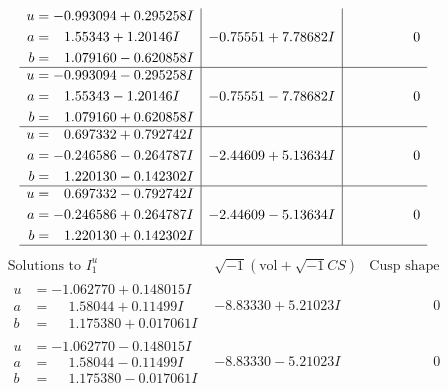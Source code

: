 \documentclass[1p]{elsarticle_modified}
\theoremstyle{definition}
\newcommand{\I}{\sqrt{-1}}
\begin{document}
$$\begin{array}{c|c|c}
\begin{aligned}
u &= -0.993094 + 0.295258 I \\
a &= \phantom{-}1.55343 + 1.20146 I \\
b &= \phantom{-}1.079160 - 0.620858 I\end{aligned}
 & -0.75551 + 7.78682 I & \phantom{-0.000000 } 0 \\ \hline\begin{aligned}
u &= -0.993094 - 0.295258 I \\
a &= \phantom{-}1.55343 - 1.20146 I \\
b &= \phantom{-}1.079160 + 0.620858 I\end{aligned}
 & -0.75551 - 7.78682 I & \phantom{-0.000000 } 0 \\ \hline\begin{aligned}
u &= \phantom{-}0.697332 + 0.792742 I \\
a &= -0.246586 - 0.264787 I \\
b &= \phantom{-}1.220130 - 0.142302 I\end{aligned}
 & -2.44609 + 5.13634 I & \phantom{-0.000000 } 0 \\ \hline\begin{aligned}
u &= \phantom{-}0.697332 - 0.792742 I \\
a &= -0.246586 + 0.264787 I \\
b &= \phantom{-}1.220130 + 0.142302 I\end{aligned}
 & -2.44609 - 5.13634 I & \phantom{-0.000000 } 0\\
 \hline 
 \end{array}$$\newpage$$\begin{array}{c|c|c}  
\text{Solutions to }I^u_{1}& \I (\text{vol} + \sqrt{-1}CS) & \text{Cusp shape}\\
 \hline 
\begin{aligned}
u &= -1.062770 + 0.148015 I \\
a &= \phantom{-}1.58044 + 0.11499 I \\
b &= \phantom{-}1.175380 + 0.017061 I\end{aligned}
 & -8.83330 + 5.21023 I & \phantom{-0.000000 } 0 \\ \hline\begin{aligned}
u &= -1.062770 - 0.148015 I \\
a &= \phantom{-}1.58044 - 0.11499 I \\
b &= \phantom{-}1.175380 - 0.017061 I\end{aligned}
 & -8.83330 - 5.21023 I & \phantom{-0.000000 } 0 \\ \hline\begin{aligned}

\end{aligned}
\end{array}$$
\end{document}
